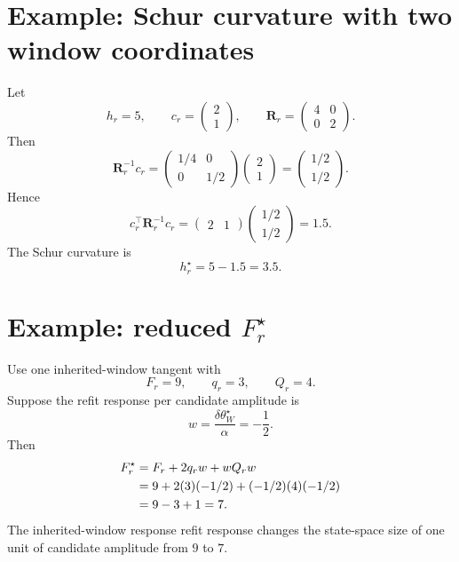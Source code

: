 \documentclass[10pt,twocolumn]{article}
\newcommand{\twovec}[2]{\begin{pmatrix}#1\\#2\end{pmatrix}}
\begin{document}
\section{Example: Schur curvature with two window coordinates}

Let
\begin{equation}
h_r=5,\qquad
c_r=\twovec{2}{1},
\qquad
\mathbf R_r=
\begin{pmatrix}
4&0\\
0&2
\end{pmatrix}.
\label{eq:ex5_data}
\end{equation}
Then
\begin{equation}
\mathbf R_r^{-1}c_r
=
\begin{pmatrix}
1/4&0\\
0&1/2
\end{pmatrix}
\twovec{2}{1}
=\twovec{1/2}{1/2}.
\label{eq:ex5_Rinv_c}
\end{equation}
Hence
\begin{equation}
c_r^\top\mathbf R_r^{-1}c_r
=
\begin{pmatrix}2&1\end{pmatrix}
\twovec{1/2}{1/2}
=1.5.
\label{eq:ex5_relax}
\end{equation}
The Schur curvature is
\begin{equation}
h_r^\star=5-1.5=3.5.
\label{eq:ex5_htilde}
\end{equation}

\section{Example: reduced \(F_r^\star\)}

Use one inherited-window tangent with
\begin{equation}
F_r=9,\qquad
q_r=3,\qquad
Q_r=4.
\label{eq:ex6_geom}
\end{equation}
Suppose the refit response per candidate amplitude is
\begin{equation}
w=\frac{\delta\theta_W^\star}{\alpha}=-\frac12.
\label{eq:ex6_w}
\end{equation}
Then
\begin{align}
F_r^\star
&=F_r+2q_rw+wQ_rw\notag\\
&=9+2(3)(-1/2)+(-1/2)(4)(-1/2)\notag\\
&=9-3+1=7.
\label{eq:ex6_Fstar}
\end{align}
The inherited-window response refit response changes the state-space size of one unit of candidate amplitude from \(9\) to \(7\).
\end{document}
